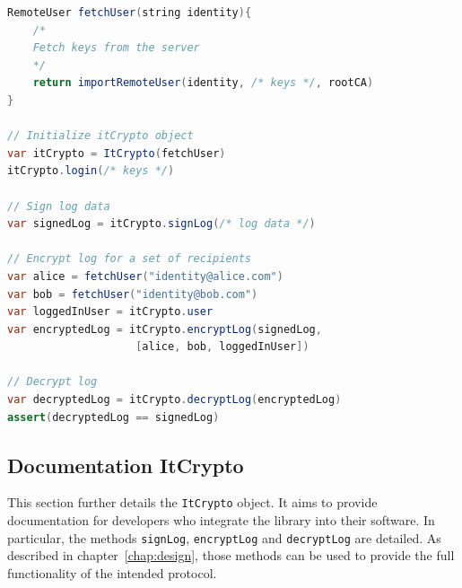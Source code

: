\documentclass[../main.tex]{subfiles}
\begin{document}
\begin{lstlisting}[label=lst:pseudocode,float,floatplacement=tbp, language=Java, caption={Pseudocode of creating, encrypting and decrypting logs using the provided libraries.}, morekeywords={RemoteUser, var, assert}, commentstyle=\color{codegreen}]
RemoteUser fetchUser(string identity){
    /*
    Fetch keys from the server
    */
    return importRemoteUser(identity, /* keys */, rootCA)
}

// Initialize itCrypto object
var itCrypto = ItCrypto(fetchUser)
itCrypto.login(/* keys */)

// Sign log data
var signedLog = itCrypto.signLog(/* log data */)

// Encrypt log for a set of recipients
var alice = fetchUser("identity@alice.com")
var bob = fetchUser("identity@bob.com")
var loggedInUser = itCrypto.user
var encryptedLog = itCrypto.encryptLog(signedLog, 
                    [alice, bob, loggedInUser])

// Decrypt log
var decryptedLog = itCrypto.decryptLog(encryptedLog)
assert(decryptedLog == signedLog)
\end{lstlisting}

\subsection{Documentation ItCrypto}
This section further details the \verb|ItCrypto| object.
It aims to provide documentation for developers who integrate the library into their software.
In particular, the methods \verb|signLog|, \verb|encryptLog| and \verb|decryptLog| are detailed.
As described in chapter~\ref{chap:design}, those methods can be used to provide the full functionality of the intended protocol.
\end{document}
